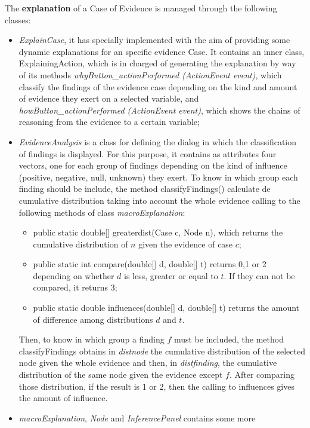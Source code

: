 The \textbf{explanation} of a Case of Evidence is managed through
the following classes:
\begin{itemize}
  \item \emph{ExplainCase}, it has specially implemented with the aim of
  providing some dynamic explanations for an specific evidence
  Case. It contains an inner class, ExplainingAction, which is in
  charged of generating the explanation by way of its methods \emph{whyButton\_actionPerformed
  (ActionEvent event)}, which classify the findings of the evidence case depending on the kind and amount of
  evidence they exert on a selected variable, and \emph{howButton\_actionPerformed (ActionEvent
  event)}, which shows the chains of reasoning from the evidence
  to a certain variable;
  \item \emph{EvidenceAnalysis} is a class for defining the dialog
  in which the classification of findings is displayed. For this
  purpose, it contains as attributes four vectors, one for each
  group of findings depending on the kind of influence (positive, negative, null, unknown) they
  exert. To know in which group each finding should be include,
  the method classifyFindings() calculate de cumulative
  distribution taking into account the whole evidence calling to
  the following methods of class \emph{macroExplanation}:
  \begin{itemize}
  \item public static double[] greaterdist(Case c, Node n), which
  returns the cumulative distribution of $n$ given the evidence of
  case $c$;
  \item public static int compare(double[] d, double[] t) returns 0,1 or 2 depending on whether $d$
  is less, greater or equal to $t$. If they can not be compared,
  it returns 3;
  \item public static double influences(double[] d, double[] t) returns the amount of difference among distributions $d$ and $t$.
  \end{itemize}
  Then, to know in which group a finding $f$ must be included,
  the method classifyFindings obtains in \emph{distnode} the cumulative distribution
  of the selected node given the whole evidence and then, in \emph{distfinding}, the cumulative
  distribution of the same node given the evidence except $f$. After comparing those distribution,
  if the result is 1 or 2, then the calling to influences gives
  the amount of influence.
  \item \emph{macroExplanation}, \emph{Node} and \emph{InferencePanel} contains some more

\end{itemize}
